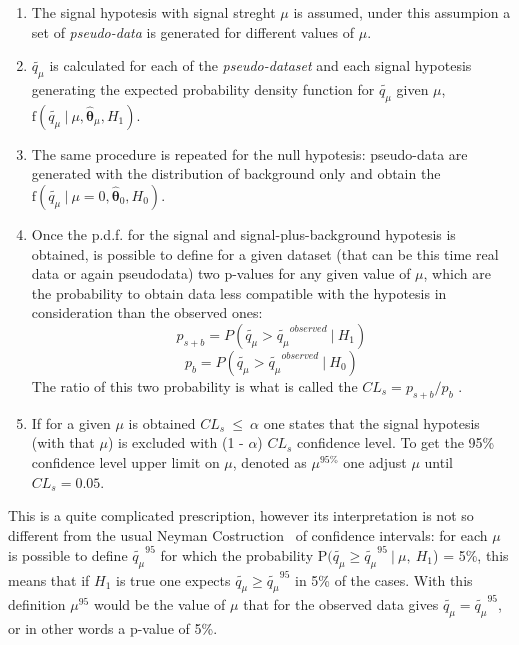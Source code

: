 \begin{enumerate}
	\item The signal hypotesis with signal streght $\mu$ is assumed, under this assumpion a set of 
	\textit{pseudo-data} is generated for different values of $\mu$.

	\item  $\tilde{q_{\mu}}$ is calculated for each of the \textit{pseudo-dataset} and each signal hypotesis generating
	the expected probability density function for $\tilde{q_{\mu}}$ given $\mu$, 
	$\text{f}(\tilde{q_{\mu}} ~| ~ \mu, \hat{\boldsymbol{\theta}}_{\mu},H_1)$.

	\item The same procedure is repeated for the null hypotesis: pseudo-data are generated with the distribution 
	of background only and 	obtain  the $\text{f}(\tilde{q_{\mu}} ~ | ~ \mu = 0, \hat{\boldsymbol{\theta}}_{0}, H_0)$.

	\item Once the p.d.f. for the signal and signal-plus-background hypotesis is obtained, 
	is possible to define for a given dataset (that can be this time
	real data or again pseudodata)  two p-values for any given value of $\mu$, which are the probability 
	to obtain data less compatible with the hypotesis in consideration than the observed ones:
	$$
	p_{s+b} = P(\tilde{q_{\mu}} > \tilde{q_{\mu}}^{observed} ~ | ~ H_1)  
	$$
	$$ 
	p_{b} = P(\tilde{q_{\mu}} > \tilde{q_{\mu}}^{observed} ~ | ~ H_0)
	$$
	The ratio of this two probability is what is called the $CL_{s} = p_{s+b} / p_{b}$ \cite{cls1,cls2}.

	\item If for a given $\mu$ is obtained $CL_{s} ~ \leq ~ \alpha $ one states that the signal hypotesis (with that $\mu$) 
	is excluded with (1 - $\alpha$) $CL_{s}$ confidence level. To get the 95\% confidence level upper limit on $\mu$,
	denoted as $\mu^{95\%}$ one adjust $\mu$ until $CL_{s} = 0.05$. 
\end{enumerate}
This is a quite complicated prescription, however 
its interpretation is not so different from the usual Neyman Costruction~\cite{} of confidence intervals:
for each $\mu$ is possible to define $\tilde{q_{\mu}}^{95}$ for which the probability 
P$(\tilde{q_{\mu}} \geq \tilde{q_{\mu}}^{95} ~ |~ \mu, ~ H_1$) = 5\%, this means that if $H_1$ is true one expects 
$\tilde{q_{\mu}} \geq \tilde{q_{\mu}}^{95}$ in 5\% of the cases. With this definition $\mu^{95}$ would be the value of $\mu$
that for the observed data gives $\tilde{q_{\mu}} = \tilde{q_{\mu}}^{95}$, or in other words a p-value of 5\%.
